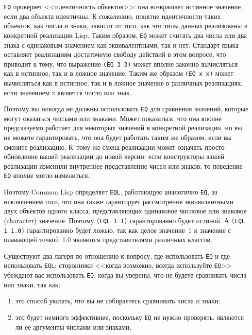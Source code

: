 \lstinline{EQ} проверяет <<идентичность объектов>>: она возвращает истинное значение, если
два объекта идентичны. К сожалению, понятие идентичности таких объектов, как числа и
знаки, зависит от того, как эти типы данных реализованы в конкретной реализации
Lisp. Таким образом, \lstinline{EQ} может считать два числа или два знака с одинаковым
значением как эквивалентными, так и нет. Стандарт языка оставляет реализациям достаточную
свободу действий в этом вопросе, что приводит к тому, что выражение \lstinline{(EQ 3 3)}
может вполне законно вычисляться как в истинное, так и в ложное значение. Таким же образом
\lstinline{(EQ x x)} может вычисляться как в истинное, так и в ложное значение в различных
реализациях, если значением x является число или знак.

Поэтому вы никогда не должны использовать \lstinline{EQ} для сравнения значений, которые
могут оказаться числами или знаками. Может показаться, что она вполне предсказуемо
работает для некоторых значений в конкретной реализации, но вы не можете гарантировать,
что она будет работать таким же образом, если вы смените реализацию. К~тому же смена
реализации может означать просто обновление вашей реализации до новой версии: если
конструкторы вашей реализации изменили внутреннее представление чисел или знаков, то
поведение \lstinline{EQ} вполне могло измениться.

Поэтому Common Lisp определяет \lstinline{EQL}, работающую аналогично \lstinline{EQ}, за
исключением того, что она также гарантирует рассмотрение эквивалентными двух объектов
одного класса, представляющих одинаковое числовое или знаковое (character)
значение. Поэтому \lstinline{(EQL 1 1)} гарантированно будет истиной. А \lstinline{(EQL 1 1.0)}
гарантированно будет ложью, так как целое значение~1 и значение с плавающей точкой~1.0
являются представителями различных классов.

Существуют два лагеря по отношению к вопросу, где использовать \lstinline{EQ} и где
использовать \lstinline{EQL}: сторонники <<когда возможно, всегда используйте \lstinline{EQ}>>
убеждают вас использовать \lstinline{EQ}, когда вы уверены, что не будете сравнивать числа
или знаки, так как:

\begin{enumerate}
\item это способ указать, что вы не собираетесь сравнивать числа и знаки; 

\item это будет немного эффективнее, поскольку \lstinline{EQ} не нужно проверять, являются
  ли её аргументы числами или знаками.
\end{enumerate}

